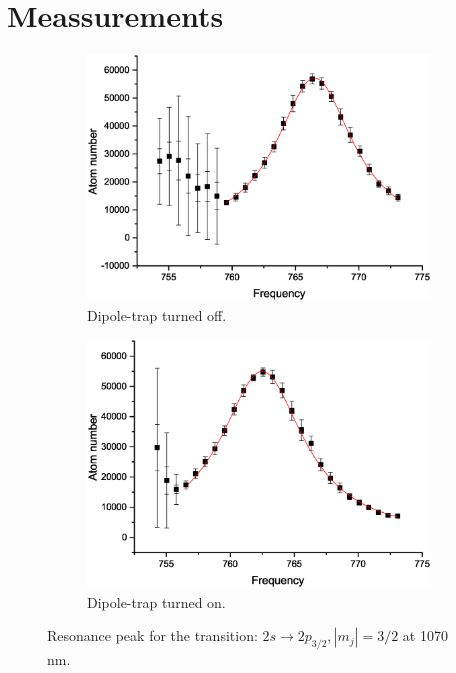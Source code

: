 \chapter{Meassurements}

\begin{figure}[H]
\centering
\begin{subfigure}[b]{0.48\textwidth}
                \includegraphics[width=\textwidth]{withoutodt}
                \caption{Dipole-trap turned off.}
\end{subfigure}
\begin{subfigure}[b]{0.48\textwidth}
               \includegraphics[width=\textwidth]{withodt}
                \caption{Dipole-trap turned on.}
\end{subfigure}


\caption{Resonance peak for the transition: $2s\rightarrow2p_{3/2}, |m_j|=3/2$ at 1070 nm.}
\label{resonance}
\end{figure}

